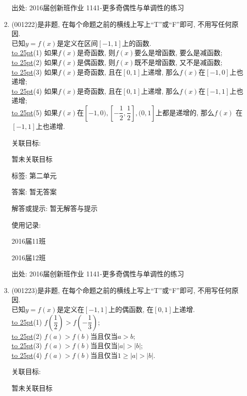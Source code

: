 \documentclass[10pt,a4paper]{article}
\newcommand{\blank}[1]{\underline{\hbox to #1pt{}}}
\begin{document}
\begin{enumerate}[1.]
出处: 2016届创新班作业	1141-更多奇偶性与单调性的练习
\item { (001222)}是非题, 在每个命题之前的横线上写上``T''或``F''即可, 不用写任何原因.\\ 
已知$y=f(x)$是定义在区间$[-1,1]$上的函数.\\ 
\blank{25}(1) 如果$f(x)$是奇函数, 则$f(x)$要么是增函数, 要么是减函数;\\ 
\blank{25}(2) 如果$f(x)$是偶函数, 则$f(x)$既不是增函数, 又不是减函数;\\ 
\blank{25}(3) 如果$f(x)$是奇函数, 且在$[0,1]$上递增, 那么$f(x)$在$[-1,0]$上也递增;\\ 
\blank{25}(4) 如果$f(x)$是奇函数, 且在$[0,1]$上递增, 那么$f(x)$在$[-1,1]$上也递增;\\ 
\blank{25}(5) 如果$f(x)$在$[-1,0),[-\dfrac{1}{2},\dfrac{1}{2}],(0,1]$上都是递增的, 那么$f(x)$ 在$[-1,1]$上也递增.


关联目标:

暂未关联目标



标签: 第二单元

答案: 暂无答案

解答或提示: 暂无解答与提示

使用记录:

2016届11班					

2016届12班					


出处: 2016届创新班作业	1141-更多奇偶性与单调性的练习
\item { (001223)}是非题, 在每个命题之前的横线上写上``T''或``F''即可, 不用写任何原因.\\ 
已知$y=f(x)$是定义在$[-1,1]$上的偶函数, 在$[0,1]$上递增.\\ 
\blank{25}(1) $f(\dfrac{1}{2})>f(-\dfrac{1}{3})$;\\ 
\blank{25}(2) $f(a)>f(b)$当且仅当$a>b$;\\ 
\blank{25}(3) $f(a)>f(b)$当且仅当$|a|>|b|$;\\ 
\blank{25}(4) $f(a)>f(b)$当且仅当$1\ge |a|>|b|$.


关联目标:

暂未关联目标




\end{enumerate}
\end{document}
